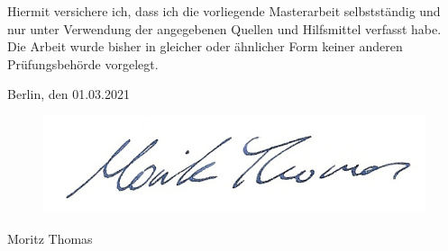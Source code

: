 
Hiermit versichere ich, dass ich die vorliegende Masterarbeit selbstständig und nur unter
Verwendung der angegebenen Quellen und Hilfsmittel verfasst habe. Die Arbeit wurde bisher
in gleicher oder ähnlicher Form keiner anderen Prüfungsbehörde vorgelegt.

\vskip 1cm

Berlin, den 01.03.2021

\begin{figure}[ht]
	\includegraphics[scale=0.5]{resources/images/Unterschrift Kopie.jpg}
\end{figure}

Moritz Thomas